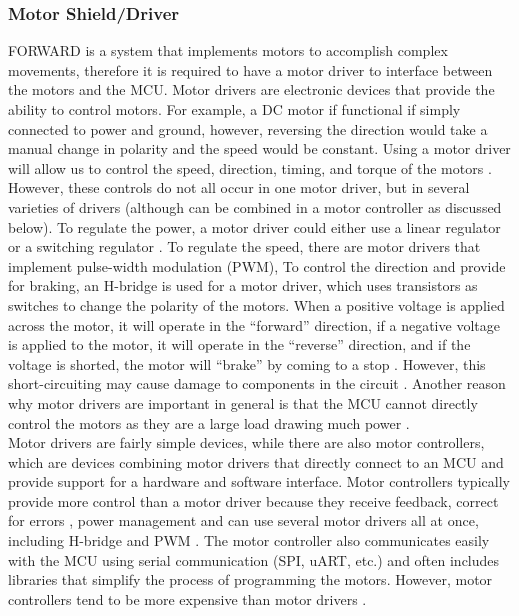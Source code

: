 \subsubsection{Motor Shield/Driver}
\noindent FORWARD is a system that implements motors to accomplish complex movements, therefore it is required to have a motor driver to interface between the motors and the MCU. Motor drivers are electronic devices that provide the ability to control motors. For example, a DC motor if functional if simply connected to power and ground, however, reversing the direction would take a manual change in polarity and the speed would be constant. Using a motor driver will allow us to control the speed, direction, timing, and torque of the motors \cite{thingbits}. However, these controls do not all occur in one motor driver, but in several varieties of drivers (although can be combined in a motor controller as discussed below). To regulate the power, a motor driver could either use a linear regulator or a switching regulator \cite{etechsparks}. To regulate the speed, there are motor drivers that implement pulse-width modulation (PWM), To control the direction and provide for braking, an H-bridge is used for a motor driver, which uses transistors as switches to change the polarity of the motors. When a positive voltage is applied across the motor, it will operate in the “forward” direction, if a negative voltage is applied to the motor, it will operate in the “reverse” direction, and if the voltage is shorted, the motor will “brake” by coming to a stop \cite{etechsparks}. However, this short-circuiting may cause damage to components in the circuit \cite{coreelectronics}. Another reason why motor drivers are important in general is that the MCU cannot directly control the motors as they are a large load drawing much power \cite{coreelectronics}.\\ 

\noindent Motor drivers are fairly simple devices, while there are also motor controllers, which are devices combining motor drivers that directly connect to an MCU and provide support for a hardware and software interface. Motor controllers typically provide more control than a motor driver because they receive feedback, correct for errors \cite{coreelectronics}, power management and can use several motor drivers all at once, including H-bridge and PWM \cite{powerelectronics}. The motor controller also communicates easily with the MCU using serial communication (SPI, uART, etc.) and often includes libraries that simplify the process of programming the motors. However, motor controllers tend to be more expensive than motor drivers \cite{coreelectronics}. \\

